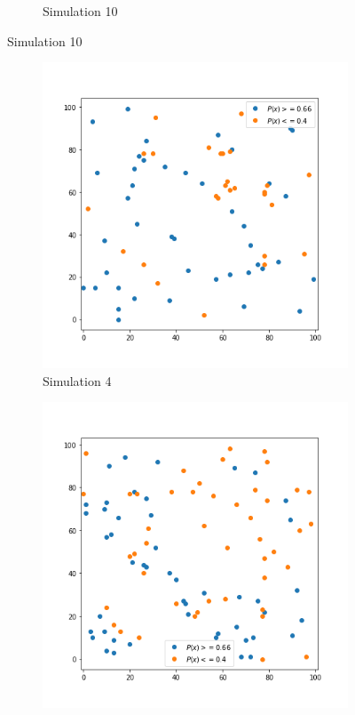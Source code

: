 \begin{figure}[!ht]
\begin{subfigure}{0.3\textwidth}
	    \caption{Simulation 10}
	    \label{fig:meine-grafik}
	\end{subfigure}
\end{figure}

\begin{figure}[!ht]
	\centering
	\begin{subfigure}{.3\textwidth}
    	\centering
    	\includegraphics[width=1\linewidth]{Bilder/simulation_2_3}
    	\caption{Simulation 4}
    \label{fig:meine-grafik}
	\end{subfigure}%
		\begin{subfigure}{.3\textwidth}
	    \centering
	    \includegraphics[width=1\linewidth]{Bilder/simulation_3_3}

\end{subfigure}
\end{figure}

